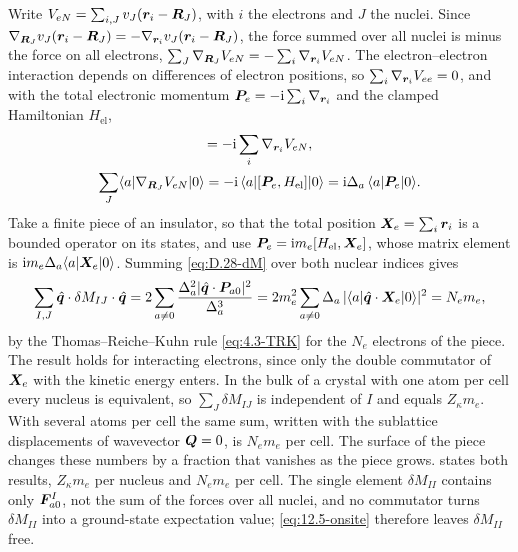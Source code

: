 Write $V_{eN} = \sum_{i,J}v_J(\bm{r}_i - \bm{R}_J)$, with $i$ the electrons and $J$ the nuclei. Since $\nabla_{\bm{R}_J}v_J(\bm{r}_i - \bm{R}_J) = -\nabla_{\bm{r}_i}v_J(\bm{r}_i - \bm{R}_J)$, the force summed over all nuclei is minus the force on all electrons, $\sum_J\nabla_{\bm{R}_J}V_{eN} = -\sum_i\nabla_{\bm{r}_i}V_{eN}$. The electron--electron interaction depends on differences of electron positions, so $\sum_i\nabla_{\bm{r}_i}V_{ee} = 0$, and with the total electronic momentum $\bm{P}_e = -\mathrm{i}\sum_i\nabla_{\bm{r}_i}$ and the clamped Hamiltonian $H_{\mathrm{el}}$,
\begin{gather*}
  [\vect{P}_e, H_{\mathrm{el}}] = -\ii\sum_i\nabla_{\vect{r}_i}V_{eN} , \\
  \sum_J\langle a|\nabla_{\vect{R}_J}V_{eN}|0\rangle = -\ii\,\langle a|[\vect{P}_e, H_{\mathrm{el}}]|0\rangle = \ii\Delta_a\,\langle a|\vect{P}_e|0\rangle .
\end{gather*}
Take a finite piece of an insulator, so that the total position $\bm{X}_e = \sum_i\bm{r}_i$ is a bounded operator on its states, and use $\bm{P}_e = \mathrm{i} m_e[H_{\mathrm{el}}, \bm{X}_e]$, whose matrix element is $\mathrm{i} m_e\Delta_a\langle a|\bm{X}_e|0\rangle$. Summing \cref{eq:D.28-dM} over both nuclear indices gives
\begin{equation*}
  \sum_{I,J}\hat{\bm{q}}\cdot\delta M_{IJ}\cdot\hat{\bm{q}} = 2\sum_{a\neq0}\frac{\Delta_a^2|\hat{\bm{q}}\cdot\bm{P}_{a0}|^2}{\Delta_a^3}
  = 2m_e^2\sum_{a\neq0}\Delta_a\,|\langle a|\hat{\bm{q}}\cdot\bm{X}_e|0\rangle|^2 = N_em_e ,
\end{equation*}
by the Thomas--Reiche--Kuhn rule \cref{eq:4.3-TRK} for the $N_e$ electrons of the piece. The result holds for interacting electrons, since only the double commutator of $\bm{X}_e$ with the kinetic energy enters. In the bulk of a crystal with one atom per cell every nucleus is equivalent, so $\sum_J\delta M_{IJ}$ is independent of $I$ and equals $Z_\kappa m_e$. With several atoms per cell the same sum, written with the sublattice displacements of wavevector $\bm{Q} = 0$, is $N_em_e$ per cell. The surface of the piece changes these numbers by a fraction that vanishes as the piece grows.  states both results, $Z_\kappa m_e$ per nucleus and $N_em_e$ per cell. The single element $\delta M_{II}$ contains only $\bm{F}^I_{a0}$, not the sum of the forces over all nuclei, and no commutator turns $\delta M_{II}$ into a ground-state expectation value; \cref{eq:12.5-onsite} therefore leaves $\delta M_{II}$ free.

